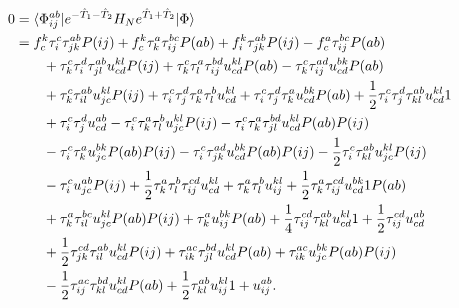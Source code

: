         \begin{align}
            0 & = \langle \Phi^{ab}_{ij} | e^{-\hat{T}_1 - \hat{T}_2} H_N
            e^{\hat{T}_1 + \hat{T}_2}| \Phi \rangle
            \\
            &=
            f^{k}_{c} \tau^{c}_{i} \tau^{ab}_{jk} P(ij)
            + f^{k}_{c} \tau^{a}_{k} \tau^{bc}_{ij} P(ab)
            + f^{k}_{i} \tau^{ab}_{jk} P(ij)
            - f^{a}_{c} \tau^{bc}_{ij} P(ab)
            \nonumber \\
            &\qquad
            + \tau^{c}_{k} \tau^{d}_{i} \tau^{ab}_{jl} u^{kl}_{cd} P(ij)
            + \tau^{c}_{k} \tau^{a}_{l} \tau^{bd}_{ij} u^{kl}_{cd} P(ab)
            - \tau^{c}_{k} \tau^{ad}_{ij} u^{bk}_{cd} P(ab)
            \nonumber \\
            &\qquad
            + \tau^{c}_{k} \tau^{ab}_{il} u^{kl}_{jc} P(ij)
            + \tau^{c}_{i} \tau^{d}_{j} \tau^{a}_{k} \tau^{b}_{l} u^{kl}_{cd}
            + \tau^{c}_{i} \tau^{d}_{j} \tau^{a}_{k} u^{bk}_{cd} P(ab)
            + \frac{1}{2} \tau^{c}_{i} \tau^{d}_{j} \tau^{ab}_{kl} u^{kl}_{cd} 1
            \nonumber \\
            &\qquad
            + \tau^{c}_{i} \tau^{d}_{j} u^{ab}_{cd}
            - \tau^{c}_{i} \tau^{a}_{k} \tau^{b}_{l} u^{kl}_{jc} P(ij)
            - \tau^{c}_{i} \tau^{a}_{k} \tau^{bd}_{jl} u^{kl}_{cd} P(ab) P(ij)
            \nonumber \\
            &\qquad
            - \tau^{c}_{i} \tau^{a}_{k} u^{bk}_{jc} P(ab) P(ij)
            - \tau^{c}_{i} \tau^{ad}_{jk} u^{bk}_{cd} P(ab) P(ij)
            - \frac{1}{2} \tau^{c}_{i} \tau^{ab}_{kl} u^{kl}_{jc} P(ij)
            \nonumber \\
            &\qquad
            - \tau^{c}_{i} u^{ab}_{jc} P(ij)
            + \frac{1}{2} \tau^{a}_{k} \tau^{b}_{l} \tau^{cd}_{ij} u^{kl}_{cd}
            + \tau^{a}_{k} \tau^{b}_{l} u^{kl}_{ij}
            + \frac{1}{2} \tau^{a}_{k} \tau^{cd}_{ij} u^{bk}_{cd} 1 P(ab)
            \nonumber \\
            &\qquad
            + \tau^{a}_{k} \tau^{bc}_{il} u^{kl}_{jc} P(ab) P(ij)
            + \tau^{a}_{k} u^{bk}_{ij} P(ab)
            + \frac{1}{4} \tau^{cd}_{ij} \tau^{ab}_{kl} u^{kl}_{cd} 1
            + \frac{1}{2} \tau^{cd}_{ij} u^{ab}_{cd}
            \nonumber \\
            &\qquad
            + \frac{1}{2} \tau^{cd}_{jk} \tau^{ab}_{il} u^{kl}_{cd} P(ij)
            + \tau^{ac}_{ik} \tau^{bd}_{jl} u^{kl}_{cd} P(ab)
            + \tau^{ac}_{ik} u^{bk}_{jc} P(ab) P(ij)
            \nonumber \\
            &\qquad
            - \frac{1}{2} \tau^{ac}_{ij} \tau^{bd}_{kl} u^{kl}_{cd} P(ab)
            + \frac{1}{2} \tau^{ab}_{kl} u^{kl}_{ij} 1
            + u^{ab}_{ij}.
        \end{align}

